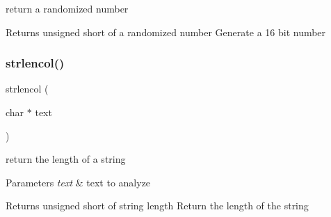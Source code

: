 return a randomized number 

\begin{DoxyReturn}{Returns}
unsigned short of a randomized number Generate a 16 bit number 
\end{DoxyReturn}
\mbox{\label{a00047_a13706944b8c204cb91753180f914c63c}} 
\subsubsection{\texorpdfstring{strlencol()}{strlencol()}}
{\footnotesize\ttfamily strlencol (\begin{DoxyParamCaption}\item[{char $\ast$}]{text }\end{DoxyParamCaption})}



return the length of a string 


\begin{DoxyParams}{Parameters}
{\em text} & text to analyze \\
\hline
\end{DoxyParams}
\begin{DoxyReturn}{Returns}
unsigned short of string length Return the length of the string 
\end{DoxyReturn}
